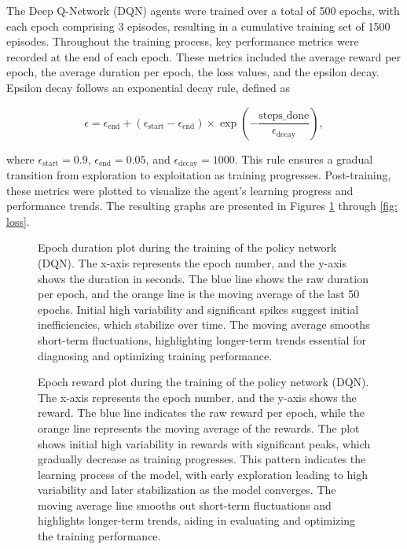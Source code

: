 \documentclass[twocolumn]{webofc}
\begin{document}
The Deep Q-Network (DQN) agents were trained over a total of 500 epochs, with each epoch comprising 3 episodes, resulting in a cumulative training set of 1500 episodes. Throughout the training process, key performance metrics were recorded at the end of each epoch. These metrics included the average reward per epoch, the average duration per epoch, the loss values, and the epsilon decay. Epsilon decay follows an exponential decay rule, defined as

\begin{equation}
\epsilon = \epsilon_{\text{end}} + (\epsilon_{\text{start}} - \epsilon_{\text{end}}) \times \exp\left(-\frac{\text{steps\_done}}{\epsilon_{\text{decay}}}\right),
\end{equation}

where \(\epsilon_{\text{start}} = 0.9\), \(\epsilon_{\text{end}} = 0.05\), and \(\epsilon_{\text{decay}} = 1000\). This rule ensures a gradual transition from exploration to exploitation as training progresses. Post-training, these metrics were plotted to visualize the agent's learning progress and performance trends. The resulting graphs are presented in Figures \ref{fig: episode_duration} through \ref{fig: loss}.


\begin{figure}[!h]
\centering

\caption{Epoch duration plot during the training of the policy network (DQN). The x-axis represents the epoch number, and the y-axis shows the duration in seconds. The blue line shows the raw duration per epoch, and the orange line is the moving average of the last 50 epochs. Initial high variability and significant spikes suggest initial inefficiencies, which stabilize over time. The moving average smooths short-term fluctuations, highlighting longer-term trends essential for diagnosing and optimizing training performance.}


\label{fig: episode_duration}
\end{figure}

\begin{figure}[!h]
\centering
\centerline{}
\caption{Epoch reward plot during the training of the policy network (DQN). The x-axis represents the epoch number, and the y-axis shows the reward. The blue line indicates the raw reward per epoch, while the orange line represents the moving average of the rewards. The plot shows initial high variability in rewards with significant peaks, which gradually decrease as training progresses. This pattern indicates the learning process of the model, with early exploration leading to high variability and later stabilization as the model converges. The moving average line smooths out short-term fluctuations and highlights longer-term trends, aiding in evaluating and optimizing the training performance.}
\label{fig: episode_reward}
\end{figure}
\end{document}

